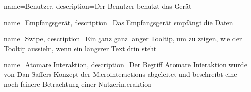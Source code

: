 {
    name=Benutzer,
    description={Der Benutzer benutzt das Gerät}
}

{
    name=Empfangsgerät,
    description={Das Empfangsgerät empfängt die Daten}
}

{
    name=Swipe,
    description={Ein ganz ganz langer Tooltip, um zu zeigen, wie der Tooltip aussieht, wenn ein längerer Text drin steht}
}

{
    name=Atomare Interaktion,
    description={Der Begriff Atomare Interaktion wurde von Dan Saffers Konzept der Microinteractions abgeleitet und beschreibt eine noch feinere Betrachtung einer Nutzerinteraktion}
}